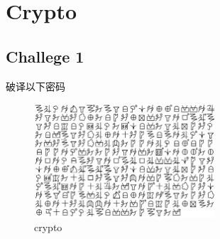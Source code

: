 \documentclass{article}
\begin{document}
\section*{Crypto}
\subsection*{Challege 1}
\par 破译以下密码
\begin{figure}[H]
    \centering
    \includegraphics[width=0.6\textwidth]{./figure/crypto1.png}
    \caption{crypto}
\end{figure}
\end{document}
